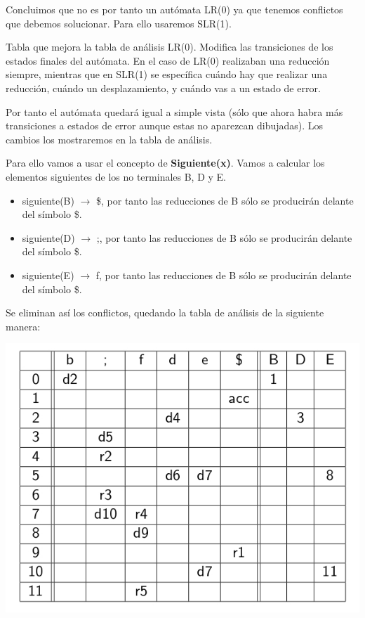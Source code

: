\documentclass{apuntes}
\begin{document}
\begin{example}
Concluimos que no es por tanto un autómata LR(0) ya que tenemos conflictos que debemos solucionar. Para ello usaremos SLR(1).

\begin{defn}
Tabla que mejora la tabla de análisis LR(0). Modifica las transiciones de los estados finales del autómata. En el caso de LR(0) realizaban una reducción siempre, mientras que en SLR(1) se específica cuándo hay que realizar una reducción, cuándo un desplazamiento, y cuándo vas  a un estado de error.
\end{defn}

Por tanto el autómata quedará igual a simple vista (sólo que ahora habra más transiciones a estados de error aunque estas no aparezcan dibujadas). Los cambios los mostraremos en la tabla de análisis.

Para ello vamos a usar el concepto de \textbf{Siguiente(x)}. Vamos a calcular los elementos siguientes de los no terminales B, D y E.

\begin{itemize}
\item siguiente(B) $\rightarrow$ {\$}, por tanto las reducciones de B sólo se producirán delante del símbolo \$.
\item siguiente(D) $\rightarrow$ {;}, por tanto las reducciones de B sólo se producirán delante del símbolo \$.
\item siguiente(E) $\rightarrow$ {f}, por tanto las reducciones de B sólo se producirán delante del símbolo \$.
\end{itemize}

Se eliminan así los conflictos, quedando la tabla de análisis de la siguiente manera:

\begin{center}
\includegraphics[scale=0.4]{img/tablaanalisisslr1.jpg}
\end{center}


\end{example}
\end{document}

